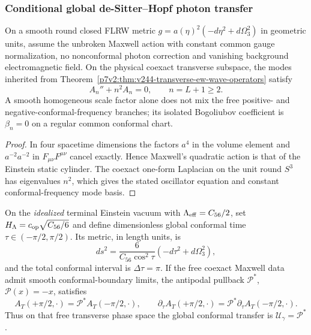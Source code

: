\documentclass[11pt,a4paper]{article}
\begin{document}
\subsubsection{Conditional global de-Sitter--Hopf photon transfer}
\label{p5c:sec:v290-ds-hopf-photon-transfer}
\begin{proposition}
\label{p5c:prop:v290-conformal-photon-rigidity}
On a smooth round closed FLRW metric
$g=a(\eta)^2(-d\eta^2+d\Omega_3^2)$ in geometric units, assume the
unbroken Maxwell action with constant common gauge normalization, no
nonconformal photon correction and vanishing background electromagnetic
field.  On the physical coexact transverse subspace, the modes inherited
from Theorem~\ref{p7v2:thm:v244-transverse-ew-wave-operators} satisfy
\[
 \boxed{A_n''+n^2A_n=0,\qquad n=L+1\ge2.}
\]
A smooth homogeneous scale factor alone does not mix the free positive-
and negative-conformal-frequency branches; its isolated Bogoliubov
coefficient is $\beta_n=0$ on a regular common conformal chart.
\end{proposition}
\begin{proof}
In four spacetime dimensions the factors $a^4$ in the volume element
and $a^{-2}a^{-2}$ in $F_{\mu\nu}F^{\mu\nu}$ cancel exactly.  Hence
Maxwell's quadratic action is that of the Einstein static cylinder.
The coexact one-form Laplacian on the unit round $S^3$ has eigenvalues
$n^2$, which gives the stated oscillator equation and constant
conformal-frequency mode basis.
\end{proof}
\begin{corollary}
\label{p5c:cor:v290-terminal-de-sitter-antipode}
On the \emph{idealized} terminal Einstein vacuum with
$\Lambda_{\rm eff}=C_{56}/2$, set
$H_\Lambda=c_{\rm op}\sqrt{C_{56}/6}$ and define dimensionless global
conformal time $\tau\in(-\pi/2,\pi/2)$.  Its metric, in length units,
is
\[
 ds^2=\frac{6}{C_{56}\cos^2\tau}
       (-d\tau^2+d\Omega_3^2),
\]
and the total conformal interval is $\Delta\tau=\pi$.  If the free
coexact Maxwell data admit smooth conformal-boundary limits, the antipodal
pullback $\mathcal P^*$, $\mathcal P(x)=-x$, satisfies
\[
 \boxed{
 A_T(+\pi/2,\cdot)=\mathcal P^*A_T(-\pi/2,\cdot),\qquad
 \partial_\tau A_T(+\pi/2,\cdot)
 =\mathcal P^*\partial_\tau A_T(-\pi/2,\cdot).}
\]
Thus on that free transverse phase space the global conformal transfer
is $\boxed{\mathcal U_\gamma=\mathcal P^*}$.
\end{corollary}
\end{document}
